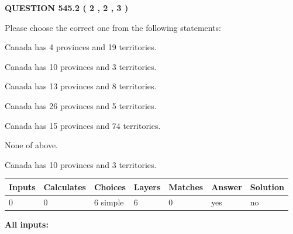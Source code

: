 \documentclass[12pt]{article}
\begin{document}
   
  
\vspace{0.2in}
  
{\textbf{\Large{QUESTION
545.2 
 ( 2 , 2 , 3 )
}}}
  
  
Please choose the correct one from the following statements:
 
 
Canada has   4 provinces and  19 territories.
 
 
Canada has 10  provinces and 3 territories.
 
 
Canada has  13 provinces and  8 territories.
 
 
Canada has  26 provinces and  5 territories.
 
 
Canada has  15 provinces and  74 territories.
 
 
 None of above.
 
 
\noindent{}
 
 
Canada has 10  provinces and 3 territories.
 
 
\noindent{}
 
 
   
   
   
   
\noindent\begin{tabular}{|l|l|l|l|l|l|l|}
 \hline
Inputs & Calculates & Choices & Layers & Matches & Answer & Solution \\ \hline
 0  & 
 0  & 
 6
  simple  
  & 
 6  & 
 0  & 
  yes & 
  no 
  \\ \hline
 \end{tabular}
   
   
   
   
\noindent{}
   
   
   
   
\noindent\vspace{0.1in}\hspace{-0.08in} {\textbf{\Large{All inputs: }}}
   
   
   
   
   
   
 \vspace{0.2in}
 
\end{document}

